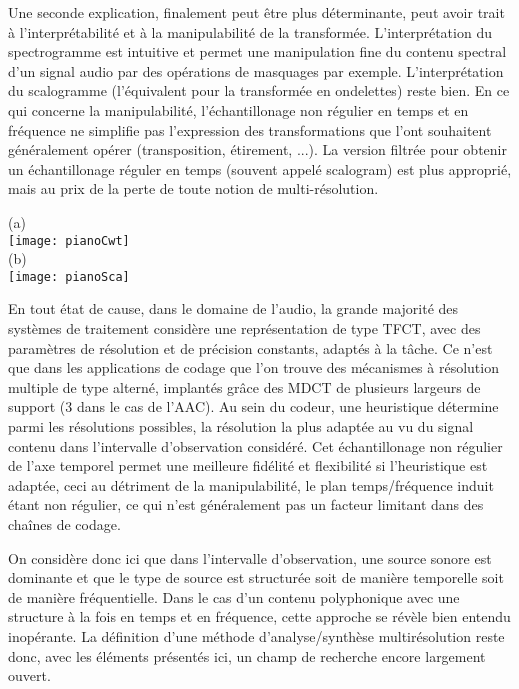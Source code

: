 Une seconde explication, finalement peut être plus déterminante, peut avoir trait à l'interprétabilité et à la manipulabilité de la transformée. L'interprétation  du spectrogramme est intuitive et permet une manipulation fine du contenu spectral d'un signal audio par des opérations de masquages par exemple. L'interprétation du scalogramme (l'équivalent pour la transformée en ondelettes) reste bien. En ce qui concerne la manipulabilité, l'échantillonage non régulier en temps et en fréquence ne simplifie pas l'expression des transformations que l'ont souhaitent généralement opérer (transposition, étirement, ...). La version filtrée pour obtenir un échantillonage réguler en temps (souvent appelé scalogram) est plus approprié, mais au prix de la perte de toute notion de multi-résolution.

\begin{marginfigure}
  (a) \\
  \texttt{[image: pianoCwt]} \\
  (b) \\
  \texttt{[image: pianoSca]}
  \caption{transformée en ondelttes (a) et scalogramme (b) d'une note de piano.}
\end{marginfigure}

En tout état de cause, dans le domaine de l'audio, la grande majorité des systèmes de traitement considère une représentation de type TFCT, avec des paramètres de résolution et de précision constants, adaptés à la tâche. Ce n'est que dans les applications de codage que l'on trouve des mécanismes à résolution multiple de type alterné, implantés grâce des MDCT de plusieurs largeurs de support (3 dans le cas de l'AAC)\cite{brandenburg1999mp3}. Au sein du codeur, une heuristique détermine parmi les résolutions possibles, la résolution la plus adaptée au vu du signal contenu dans l'intervalle d'observation considéré. Cet échantillonage non régulier de l'axe temporel permet une meilleure fidélité et flexibilité si l'heuristique est adaptée, ceci au détriment de la manipulabilité, le plan temps/fréquence induit étant non régulier, ce qui n'est généralement pas un facteur  limitant dans des chaînes de codage.

On considère donc ici que dans l'intervalle d'observation, une source sonore est dominante et que le type de source est structurée soit de manière temporelle soit de manière fréquentielle. Dans le cas d'un contenu polyphonique avec une structure à la fois en temps et en fréquence, cette approche se révèle bien entendu inopérante. La définition d'une méthode d'analyse/synthèse multirésolution reste donc, avec les éléments présentés ici, un champ de recherche encore largement ouvert.

